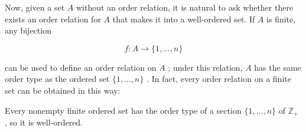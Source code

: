 Now, given a set \(A\) without an order relation, it is natural to ask whether there exists an order relation for \(A\) that makes it into a well-ordered set. If \(A\) is finite, any bijection

\[
f : A \rightarrow  \{ 1,\ldots ,n\}
\]

can be used to define an order relation on \(A\) ; under this relation, \(A\) has the same order type as the ordered set \(\{ 1,\ldots ,n\}\) . In fact, every order relation on a finite set can be obtained in this way:

\begin{theorem} Every nonempty finite ordered set has the order type of a section \(\{ 1,\ldots ,n\}\) of \({\mathbb{Z}}_{ + }\) , so it is well-ordered.
\end{theorem}

